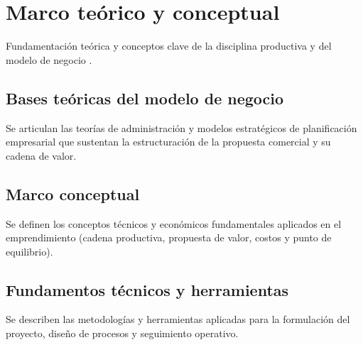 \section{Marco teórico y conceptual}
\label{sec:marco_teorico}

Fundamentación teórica y conceptos clave de la disciplina productiva y del modelo de negocio \parencite{osterwalder2010generacion, kotler2016direccion}.

\subsection{Bases teóricas del modelo de negocio}
Se articulan las teorías de administración y modelos estratégicos de planificación empresarial que sustentan la estructuración de la propuesta comercial y su cadena de valor.

\subsection{Marco conceptual}
Se definen los conceptos técnicos y económicos fundamentales aplicados en el emprendimiento (cadena productiva, propuesta de valor, costos y punto de equilibrio).

\subsection{Fundamentos técnicos y herramientas}
Se describen las metodologías y herramientas aplicadas para la formulación del proyecto, diseño de procesos y seguimiento operativo.


